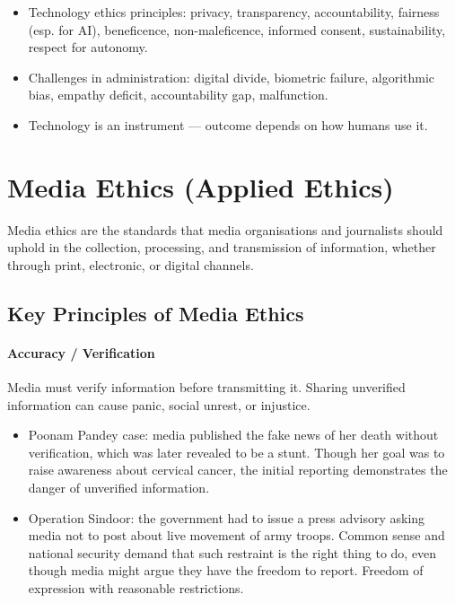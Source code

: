 \begin{QuickRevision}
\begin{itemize}
\item Technology ethics principles: privacy, transparency, accountability, fairness (esp. for AI), beneficence, non-maleficence, informed consent, sustainability, respect for autonomy.
\item Challenges in administration: digital divide, biometric failure, algorithmic bias, empathy deficit, accountability gap, malfunction.
\item Technology is an instrument --- outcome depends on how humans use it.
\end{itemize}
\end{QuickRevision}

\section{Media Ethics (Applied Ethics)}

Media ethics are the standards that media organisations and journalists should uphold in the collection, processing, and transmission of information, whether through print, electronic, or digital channels.

\subsection{Key Principles of Media Ethics}

\paragraph{Accuracy / Verification} Media must verify information before transmitting it. Sharing unverified information can cause panic, social unrest, or injustice.

\begin{ExampleBox}
\begin{itemize}
\item Poonam Pandey case: media published the fake news of her death without verification, which was later revealed to be a stunt. Though her goal was to raise awareness about cervical cancer, the initial reporting demonstrates the danger of unverified information.
\item Operation Sindoor: the government had to issue a press advisory asking media not to post about live movement of army troops. Common sense and national security demand that such restraint is the right thing to do, even though media might argue they have the freedom to report. Freedom of expression with reasonable restrictions.
\end{itemize}
\end{ExampleBox}

